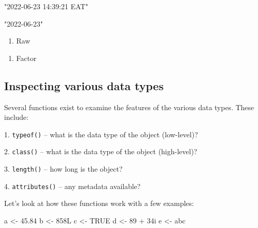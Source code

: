 \documentclass[
  letterpaper,
  DIV=11,
  numbers=noendperiod]{scrreprt}
\newenvironment{Shaded}{}{}
\newcommand{\ConstantTok}[1]{\textcolor[rgb]{0.00,0.36,0.77}{#1}}
\newcommand{\DecValTok}[1]{\textcolor[rgb]{0.00,0.36,0.77}{#1}}
\newcommand{\FloatTok}[1]{\textcolor[rgb]{0.00,0.36,0.77}{#1}}
\newcommand{\NormalTok}[1]{\textcolor[rgb]{0.14,0.16,0.18}{#1}}
\newcommand{\OtherTok}[1]{\textcolor[rgb]{0.44,0.26,0.76}{#1}}
\newcommand{\SpecialCharTok}[1]{\textcolor[rgb]{0.00,0.36,0.77}{#1}}
\newcommand{\StringTok}[1]{\textcolor[rgb]{0.01,0.18,0.38}{#1}}
\providecommand{\tightlist}{%
  \setlength{\itemsep}{0pt}\setlength{\parskip}{0pt}}\usepackage{longtable,booktabs,array}
\begin{document}
\begin{Shaded}
\begin{Highlighting}[]
\StringTok{"2022{-}06{-}23 14:39:21 EAT"}
\end{Highlighting}
\end{Shaded}

\begin{Shaded}
\begin{Highlighting}[]
\StringTok{"2022{-}06{-}23"}
\end{Highlighting}
\end{Shaded}

\begin{enumerate}
\def\labelenumi{\arabic{enumi}.}
\setcounter{enumi}{6}
\tightlist
\item
  Raw
\end{enumerate}

\begin{enumerate}
\def\labelenumi{\arabic{enumi}.}
\setcounter{enumi}{7}
\tightlist
\item
  Factor
\end{enumerate}

\subsection{Inspecting various data
types}\label{inspecting-various-data-types}

Several functions exist to examine the features of the various data
types. These include:

1. \texttt{typeof()} -- what is the data type of the object (low-level)?

2. \texttt{class()} -- what is the data type of the object (high-level)?

3. \texttt{length()} -- how long is the object?

4. \texttt{attributes()} -- any metadata available?

Let's look at how these functions work with a few examples:

\begin{Shaded}
\begin{Highlighting}[]
\NormalTok{a }\OtherTok{\textless{}{-}} \FloatTok{45.84}
\NormalTok{b }\OtherTok{\textless{}{-}} \DecValTok{858}\NormalTok{L}
\NormalTok{c }\OtherTok{\textless{}{-}} \ConstantTok{TRUE}
\NormalTok{d }\OtherTok{\textless{}{-}} \DecValTok{89} \SpecialCharTok{+} \DecValTok{34}\NormalTok{i}
\NormalTok{e }\OtherTok{\textless{}{-}} \StringTok{\textquotesingle{}abc\textquotesingle{}}
\end{Highlighting}
\end{Shaded}
\end{document}
